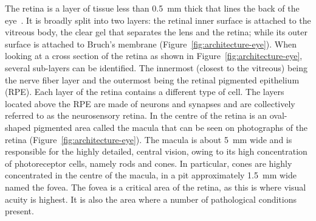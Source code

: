 \documentclass{article}
\begin{document}
The retina is a layer of tissue less than \SI{0.5}{\mm} thick that lines the back of the eye~\cite{Gupta_2015}.
It is broadly split into two layers: the retinal inner surface is attached to the vitreous body, the clear gel that separates the lens and the retina; while its outer surface is attached to Bruch's membrane (Figure~\ref{fig:architecture-eye}).
When looking at a cross section of the retina as shown in Figure~\ref{fig:architecture-eye}, several sub-layers can be identified. The innermost (closest to the vitreous) being the nerve fiber layer and the outermost being the retinal pigmented epithelium (RPE).
Each layer of the retina contains a different type of cell.
The layers located above the RPE are made of neurons and synapses and are collectively referred to as the neurosensory retina.
In the centre of the retina is an oval-shaped pigmented area called the macula that can be seen on photographs of the retina (Figure~\ref{fig:architecture-eye}).
The macula is about \SI{5}{\mm} wide and is responsible for the highly detailed, central vision, owing to its high concentration of photoreceptor cells, namely rods and cones.
In particular, cones are highly concentrated in the centre of the macula, in a pit approximately \SI{1.5}{\mm} wide named the fovea.
The fovea is a critical area of the retina, as this is where visual acuity is highest.
It is also the area where a number of pathological conditions present.
\end{document}
